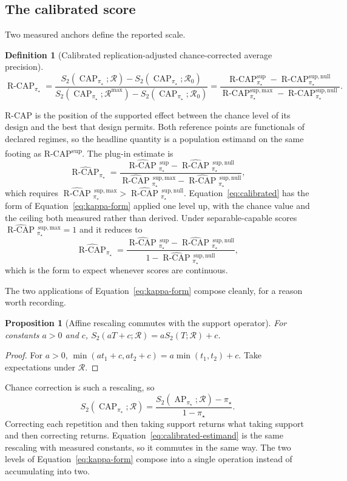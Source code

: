 \documentclass[11pt]{article}
\newcommand{\AP}{\operatorname{AP}}
\newcommand{\CAP}{\operatorname{CAP}}
\newcommand{\Regime}{\mathcal{R}}
\newcommand{\Tpi}{\CAP_{\pi_\star}}
\newcommand{\RCAP}{\operatorname{R\text{-}CAP}^{\mathrm{sup}}_{\pi_\star}}
\newcommand{\RCAPHat}{\widehat{\operatorname{R\text{-}CAP}}{}^{\,\mathrm{sup}}_{\pi_\star}}
\newcommand{\RCAPnull}{\operatorname{R\text{-}CAP}^{\mathrm{sup,null}}_{\pi_\star}}
\newcommand{\RCAPnullHat}{\widehat{\operatorname{R\text{-}CAP}}{}^{\,\mathrm{sup,null}}_{\pi_\star}}
\newcommand{\RCAPcal}{\operatorname{R\text{-}CAP}_{\pi_\star}}
\newcommand{\RCAPcalHat}{\widehat{\operatorname{R\text{-}CAP}}_{\pi_\star}}
\newcommand{\RegimeNull}{\Regime_{0}}
\newcommand{\RegimeMax}{\Regime^{\max}}
\newcommand{\RCAPmax}{\operatorname{R\text{-}CAP}^{\mathrm{sup,max}}_{\pi_\star}}
\newcommand{\RCAPmaxHat}{\widehat{\operatorname{R\text{-}CAP}}{}^{\,\mathrm{sup,max}}_{\pi_\star}}
\newtheorem{definition}{Definition}
\newtheorem{proposition}{Proposition}
\theoremstyle{remark}
\begin{document}
\subsection{The calibrated score}

Two measured anchors define the reported scale.

\begin{definition}[Calibrated replication-adjusted chance-corrected average precision]
\begin{equation}
\RCAPcal
=
\frac{S_2(\Tpi;\Regime)-S_2(\Tpi;\RegimeNull)}
     {S_2(\Tpi;\RegimeMax)-S_2(\Tpi;\RegimeNull)}
=
\frac{\RCAP-\RCAPnull}{\RCAPmax-\RCAPnull}.
\label{eq:calibrated-estimand}
\end{equation}
\end{definition}

R-CAP is the position of the supported effect between the chance level of its design and the best that design permits. Both reference points are functionals of declared regimes, so the headline quantity is a population estimand on the same footing as R-CAP\textsuperscript{sup}. The plug-in estimate is
\begin{equation}
\RCAPcalHat
=
\frac{\RCAPHat-\RCAPnullHat}{\RCAPmaxHat-\RCAPnullHat},
\label{eq:calibrated}
\end{equation}
which requires $\RCAPmaxHat>\RCAPnullHat$. Equation~\eqref{eq:calibrated} has the form of Equation~\eqref{eq:kappa-form} applied one level up, with the chance value and the ceiling both measured rather than derived. Under separable-capable scores $\RCAPmaxHat=1$ and it reduces to
\[
\RCAPcalHat
=
\frac{\RCAPHat-\RCAPnullHat}{1-\RCAPnullHat},
\]
which is the form to expect whenever scores are continuous.

The two applications of Equation~\eqref{eq:kappa-form} compose cleanly, for a reason worth recording.

\begin{proposition}[Affine rescaling commutes with the support operator]
For constants $a>0$ and $c$, $S_2(aT+c;\Regime)=aS_2(T;\Regime)+c$.
\end{proposition}

\begin{proof}
For $a>0$, $\min(at_1+c,at_2+c)=a\min(t_1,t_2)+c$. Take expectations under $\Regime$.
\end{proof}

Chance correction is such a rescaling, so
\[
S_2(\Tpi;\Regime)
=
\frac{S_2(\AP_{\pi_\star};\Regime)-\pi_\star}{1-\pi_\star}.
\]
Correcting each repetition and then taking support returns what taking support and then correcting returns. Equation~\eqref{eq:calibrated-estimand} is the same rescaling with measured constants, so it commutes in the same way. The two levels of Equation~\eqref{eq:kappa-form} compose into a single operation instead of accumulating into two.
\end{document}
